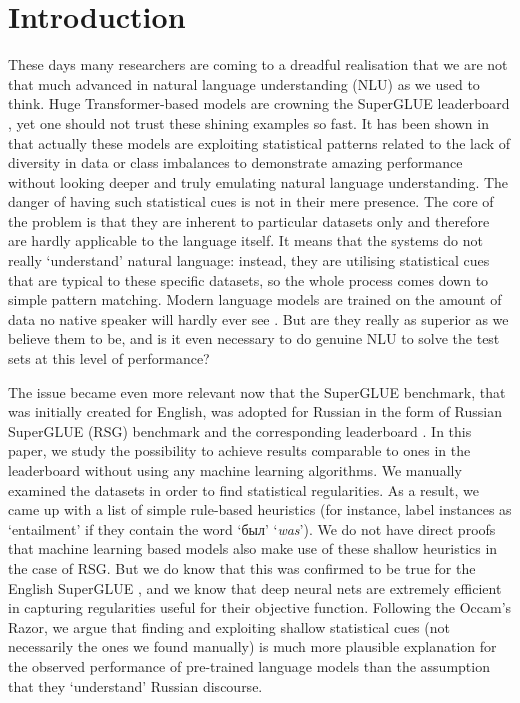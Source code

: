 \documentclass[11pt]{article}
\begin{document}
\section{Introduction}
\label{sec:introduction}
These days many researchers are coming to a dreadful realisation that we are not that much advanced in natural language understanding (NLU) as we used to think. Huge Transformer-based models are crowning the SuperGLUE leaderboard \cite{NEURIPS2019_4496bf24}, yet one should not trust these shining examples so fast. It has been shown in \cite{mccoy-etal-2019-right} that actually these models are exploiting statistical patterns related to the lack of diversity in data or class imbalances to demonstrate amazing performance without looking deeper and truly emulating natural language understanding. The danger of having such statistical cues is not in their mere presence. The core of the problem is that they are inherent to particular datasets only and therefore are hardly applicable to the language itself. It means that the systems do not really `understand' natural language: instead, they are utilising statistical cues that are typical to these specific datasets, so the whole process comes down to simple pattern matching. Modern language models are trained on the amount of data no native speaker will hardly ever see \cite{linzen-2020-accelerate}. But are they really as superior as we believe them to be, and is it even necessary to do genuine NLU to solve the test sets at this level of performance?

The issue became even more relevant now that the SuperGLUE benchmark, that was initially created for English, was adopted for Russian in the form of Russian SuperGLUE (RSG) benchmark and the corresponding leaderboard \cite{shavrina-etal-2020-russiansuperglue}. In this paper, we study the possibility to achieve results comparable to ones in the leaderboard without using any machine learning algorithms. We manually examined the datasets in order to find statistical regularities. As a result, we came up with a list of simple rule-based heuristics (for instance, label instances as `entailment' if they contain the word \foreignlanguage{russian}{`был'} `\textit{was}'). We do not have direct proofs that machine learning based models also make use of these shallow heuristics in the case of RSG. But we do know that this was confirmed to be true for the English SuperGLUE \cite{rogers-etal-2020-primer}, and we know that deep neural nets are extremely efficient in capturing regularities useful for their objective function. Following the Occam's Razor, we argue that finding and exploiting shallow statistical cues (not necessarily the ones we found manually) is much more plausible explanation for the observed performance of pre-trained language models than the assumption that they `understand' Russian discourse.
\end{document}
